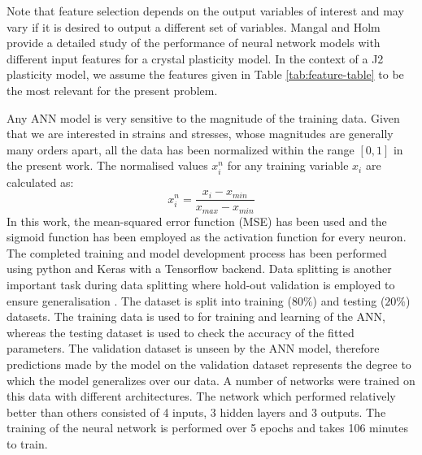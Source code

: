 Note that feature selection depends on the output variables of interest and may vary if it is desired to output a different set of variables. Mangal and Holm \cite{MANGAL2018122} provide a detailed study of the performance of neural network models with different input features for a crystal plasticity model. In the context of a J2 plasticity model, we assume the features given in Table \ref{tab:feature-table} to be the most relevant for the present problem.

Any ANN model is very sensitive to the magnitude of the training data. Given that we are interested in strains and stresses, whose magnitudes are generally many orders apart, all the data has been normalized within the range $[0,1]$ in the present work. The normalised values $x_i^n$ for any training variable $x_i$ are calculated as:
\begin{equation}
    x_i^n = \frac{x_i - x_{min}}{x_{max} - x_{min}}
\end{equation}
In this work, the mean-squared error function (MSE) has been used and the sigmoid function has been employed as the activation function for every neuron. The completed training and model development process has been performed using python and Keras with a Tensorflow backend. Data splitting is another important task during data splitting where hold-out validation is employed to ensure generalisation \cite{may2010data}. The dataset is split into training ($80\%$) and testing ($20\%$) datasets. The training data is used to for training and learning of the ANN, whereas the testing dataset is used to check the accuracy of the fitted parameters. The validation dataset is unseen by the ANN model, therefore predictions made by the model on the validation dataset represents the degree to which the model generalizes over our data. A number of networks were trained on this data with different architectures. The network which performed relatively better than others consisted of 4 inputs, 3 hidden layers and 3 outputs. The training of the neural network is performed over 5 epochs and takes 106 minutes to train. 
